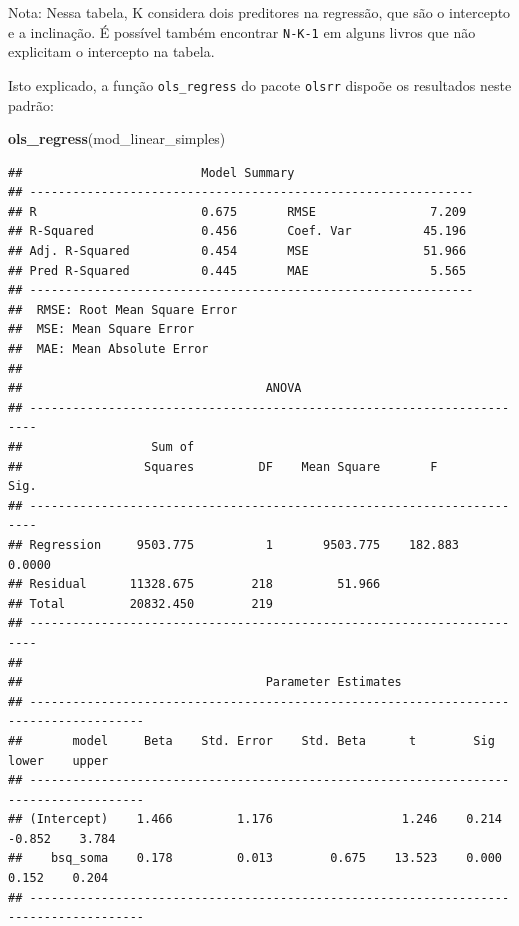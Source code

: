 \documentclass[
]{book}
\newenvironment{Shaded}{\begin{snugshade}}{\end{snugshade}}
\newcommand{\KeywordTok}[1]{\textcolor[rgb]{0.13,0.29,0.53}{\textbf{#1}}}
\newcommand{\NormalTok}[1]{#1}
\begin{document}
Nota: Nessa tabela, K considera dois preditores na regressão, que são o intercepto e a inclinação. É possível também encontrar \texttt{N-K-1} em alguns livros que não explicitam o intercepto na tabela.

Isto explicado, a função \texttt{ols\_regress} do pacote \texttt{olsrr} dispoõe os resultados neste padrão:

\begin{Shaded}
\begin{Highlighting}[]
\KeywordTok{ols_regress}\NormalTok{(mod_linear_simples) }
\end{Highlighting}
\end{Shaded}

\begin{verbatim}
##                         Model Summary                          
## --------------------------------------------------------------
## R                       0.675       RMSE                7.209 
## R-Squared               0.456       Coef. Var          45.196 
## Adj. R-Squared          0.454       MSE                51.966 
## Pred R-Squared          0.445       MAE                 5.565 
## --------------------------------------------------------------
##  RMSE: Root Mean Square Error 
##  MSE: Mean Square Error 
##  MAE: Mean Absolute Error 
## 
##                                  ANOVA                                  
## -----------------------------------------------------------------------
##                  Sum of                                                
##                 Squares         DF    Mean Square       F         Sig. 
## -----------------------------------------------------------------------
## Regression     9503.775          1       9503.775    182.883    0.0000 
## Residual      11328.675        218         51.966                      
## Total         20832.450        219                                     
## -----------------------------------------------------------------------
## 
##                                  Parameter Estimates                                   
## --------------------------------------------------------------------------------------
##       model     Beta    Std. Error    Std. Beta      t        Sig      lower    upper 
## --------------------------------------------------------------------------------------
## (Intercept)    1.466         1.176                  1.246    0.214    -0.852    3.784 
##    bsq_soma    0.178         0.013        0.675    13.523    0.000     0.152    0.204 
## --------------------------------------------------------------------------------------
\end{verbatim}
\end{document}
